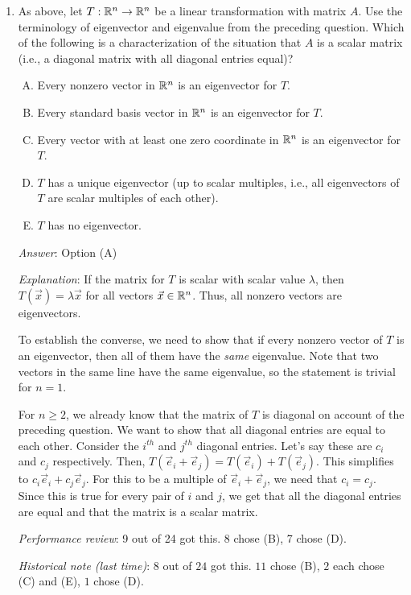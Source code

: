 \documentclass[10pt]{amsart}
\begin{document}
\begin{enumerate}
\item As above, let $T: \mathbb{R}^n \to \mathbb{R}^n$ be a linear transformation with
  matrix $A$. Use the terminology of eigenvector and eigenvalue from
  the preceding question. Which of the following is a characterization
  of the situation that $A$ is a scalar matrix (i.e., a diagonal matrix
  with all diagonal entries equal)?

  \begin{enumerate}[(A)]
  \item Every nonzero vector in $\mathbb{R}^n$ is an eigenvector for $T$.
  \item Every standard basis vector in $\mathbb{R}^n$ is an eigenvector for $T$.
  \item Every vector with at least one zero coordinate in $\mathbb{R}^n$ is an
    eigenvector for $T$.
  \item $T$ has a unique eigenvector (up to scalar multiples, i.e.,
    all eigenvectors of $T$ are scalar multiples of each other).
  \item $T$ has no eigenvector.
  \end{enumerate}

  {\em Answer}: Option (A)

  {\em Explanation}: If the matrix for $T$ is scalar with scalar value
  $\lambda$, then $T(\vec{x}) = \lambda \vec{x}$ for all vectors
  $\vec{x} \in \mathbb{R}^n$. Thus, all nonzero vectors are eigenvectors.

  To establish the converse, we need to show that if every nonzero
  vector of $T$ is an eigenvector, then all of them have the {\em
    same} eigenvalue. Note that two vectors in the same line have the
  same eigenvalue, so the statement is trivial for $n = 1$.

  For $n \ge 2$, we already know that the matrix of $T$ is diagonal on
  account of the preceding question. We want to show that all diagonal
  entries are equal to each other. Consider the $i^{th}$ and $j^{th}$
  diagonal entries. Let's say these are $c_i$ and $c_j$
  respectively. Then, $T(\vec{e}_i + \vec{e}_j) = T(\vec{e}_i) +
  T(\vec{e}_j)$. This simplifies to $c_i\vec{e}_i + c_j\vec{e}_j$. For
  this to be a multiple of $\vec{e}_i + \vec{e}_j$, we need that $c_i
  = c_j$. Since this is true for every pair of $i$ and $j$, we get
  that all the diagonal entries are equal and that the matrix is a
  scalar matrix.

  {\em Performance review}: 9 out of 24 got this. 8 chose (B), 7 chose
  (D).

  {\em Historical note (last time)}: $8$ out of $24$ got this. $11$ chose (B),
  $2$ each chose (C) and (E), $1$ chose (D).


\end{enumerate}
\end{document}
